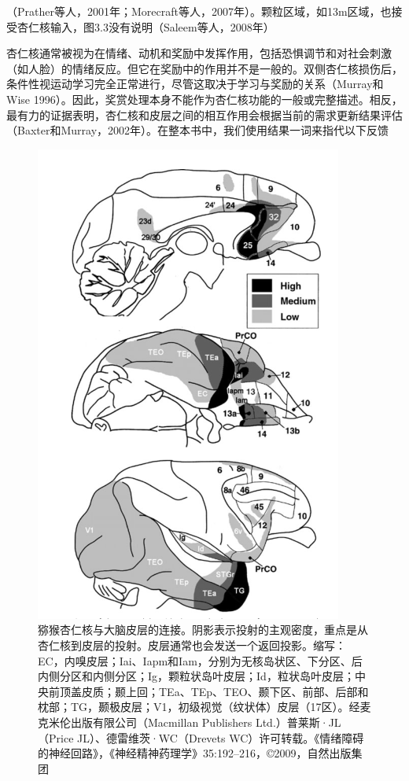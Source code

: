 （Prather等人，2001年；Morecraft等人，2007年）。颗粒区域，如13m区域，也接受杏仁核输入，图3.3没有说明（Saleem等人，2008年）\par
杏仁核通常被视为在情绪、动机和奖励中发挥作用，包括恐惧调节和对社会刺激（如人脸）的情绪反应。但它在奖励中的作用并不是一般的。双侧杏仁核损伤后，条件性视运动学习完全正常进行，尽管这取决于学习与奖励的关系（Murray和Wise 1996）。因此，奖赏处理本身不能作为杏仁核功能的一般或完整描述。相反，最有力的证据表明，杏仁核和皮层之间的相互作用会根据当前的需求更新结果评估（Baxter和Murray，2002年）。在整本书中，我们使用结果一词来指代以下反馈\par
\begin{figure}[!htb]
	\centering
	\includegraphics{image_pfc/Fig_3_3}
	\caption{猕猴杏仁核与大脑皮层的连接。阴影表示投射的主观密度，重点是从杏仁核到皮层的投射。皮层通常也会发送一个返回投影。缩写：EC，内嗅皮层；Iai、Iapm和Iam，分别为无核岛状区、下分区、后内侧分区和内侧分区；Ig，颗粒状岛叶皮层；Id，粒状岛叶皮层；中央前顶盖皮质；颞上回；TEa、TEp、TEO、颞下区、前部、后部和枕部；TG，颞极皮层；V1，初级视觉（纹状体）皮层（17区）。经麦克米伦出版有限公司（Macmillan Publishers Ltd.）普莱斯·JL（Price JL）、德雷维茨·WC（Drevets WC）许可转载。《情绪障碍的神经回路》，《神经精神药理学》35:192–216，©2009，自然出版集团}
	\label{fig:fig}
\end{figure}
